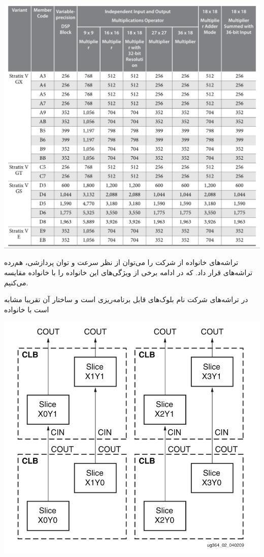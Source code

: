 \begin{qsolve}
	\begin{center}
		\includegraphics*[width=0.8\linewidth]{pics/img7.png}
		\label{ضرب‌کننده‌های Stratix}
	\end{center}
	
	تراشه‌های خانواده  از شرکت  را می‌توان از نظر سرعت و توان پردازشی، هم‌رده تراشه‌های  قرار داد. که در ادامه برخی از ویژگی‌های این خانواده را با خانواده  مقایسه می‌کنیم.
	
	در تراشه‌های شرکت  نام بلوک‌های قابل برنامه‌ریزی  است و ساختار آن تقریبا مشابه است با خانواده  
	
	\begin{center}
		\includegraphics*[width=0.5\linewidth]{pics/img9.png}
		\label{ساختار CLB ها در Virtex}
	\end{center}
	
\end{qsolve}





